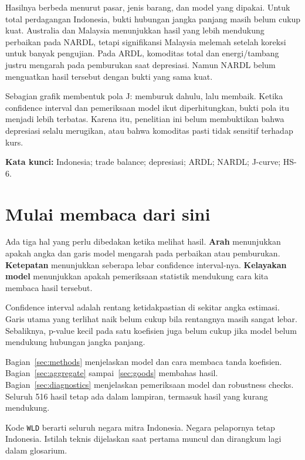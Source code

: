 \documentclass[12pt,a4paper]{article}
\begin{document}
Hasilnya berbeda menurut pasar, jenis barang, dan model yang dipakai. Untuk total perdagangan Indonesia, bukti hubungan jangka panjang masih belum cukup kuat. Australia dan Malaysia menunjukkan hasil yang lebih mendukung perbaikan pada NARDL, tetapi signifikansi Malaysia melemah setelah koreksi untuk banyak pengujian. Pada ARDL, komoditas total dan energi/tambang justru mengarah pada pemburukan saat depresiasi. Namun NARDL belum menguatkan hasil tersebut dengan bukti yang sama kuat.

Sebagian grafik membentuk pola J: memburuk dahulu, lalu membaik. Ketika confidence interval dan pemeriksaan model ikut diperhitungkan, bukti pola itu menjadi lebih terbatas. Karena itu, penelitian ini belum membuktikan bahwa depresiasi selalu merugikan, atau bahwa komoditas pasti tidak sensitif terhadap kurs.

\noindent\textbf{Kata kunci:} Indonesia; trade balance; depresiasi; ARDL; NARDL; J-curve; HS-6.

\section*{Mulai membaca dari sini}
Ada tiga hal yang perlu dibedakan ketika melihat hasil. \textbf{Arah} menunjukkan apakah angka dan garis model mengarah pada perbaikan atau pemburukan. \textbf{Ketepatan} menunjukkan seberapa lebar confidence interval-nya. \textbf{Kelayakan model} menunjukkan apakah pemeriksaan statistik mendukung cara kita membaca hasil tersebut.

Confidence interval adalah rentang ketidakpastian di sekitar angka estimasi. Garis utama yang terlihat naik belum cukup bila rentangnya masih sangat lebar. Sebaliknya, p-value kecil pada satu koefisien juga belum cukup jika model belum mendukung hubungan jangka panjang.

Bagian~\ref{sec:methods} menjelaskan model dan cara membaca tanda koefisien. Bagian~\ref{sec:aggregate} sampai~\ref{sec:goods} membahas hasil. Bagian~\ref{sec:diagnostics} menjelaskan pemeriksaan model dan robustness checks. Seluruh 516 hasil tetap ada dalam lampiran, termasuk hasil yang kurang mendukung.

Kode \texttt{WLD} berarti seluruh negara mitra Indonesia. Negara pelapornya tetap Indonesia. Istilah teknis dijelaskan saat pertama muncul dan dirangkum lagi dalam glosarium.

\clearpage\tableofcontents
\clearpage{}

\clearpage
\clearpage
\clearpage
\clearpage
\clearpage
\clearpage
\clearpage
\clearpage
\clearpage\appendix
\end{document}
